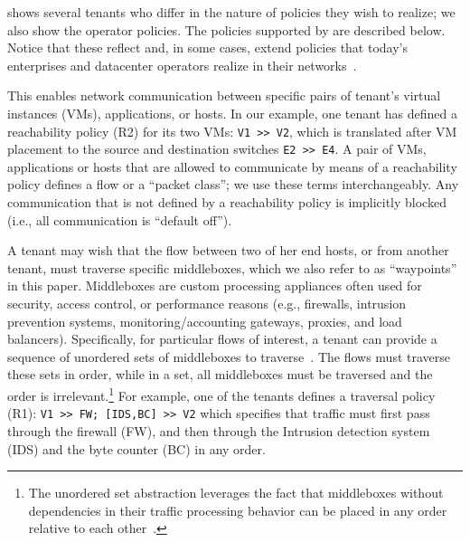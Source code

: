  
  shows several tenants who
 differ in the nature of policies they wish to realize; we also show
 the operator policies. The policies  supported by \Name are described
 below. Notice that these reflect and, in some cases, extend policies
 that today's enterprises and datacenter operators
 realize in their networks~\cite{mpa-imc15}.





 This enables network communication
  between specific pairs of tenant's virtual instances (VMs),
  applications, or hosts.  In our example, one tenant has defined a
  reachability policy (R2) for its two VMs: \texttt{V1 >> V2}, which
  is translated after VM placement  
  to the source and destination switches
   \texttt{E2 >> E4}. A pair of VMs, applications or hosts
  that are allowed to communicate by means of a reachability policy
  defines a flow or a ``packet class''; we use these terms
  interchangeably. Any communication that is not defined by a
  reachability policy is implicitly blocked (i.e., all communication
  is ``default off'').
  
 A tenant may wish that the flow
  between two of her end hosts, or from another tenant, must traverse
  specific middleboxes, which we also refer to as ``waypoints'' in
  this paper. Middleboxes are custom processing appliances often used
  for security, access control, or performance reasons (e.g.,
  firewalls, intrusion prevention systems, monitoring/accounting
  gateways, proxies, and load balancers). Specifically, for particular
  flows of interest, a tenant can provide a sequence of unordered sets
  of middleboxes
  to traverse~\cite{pga}. The flows must traverse these sets in order,
  while in a set, all middleboxes must be traversed and the order is
  irrelevant.\footnote{The unordered set abstraction leverages the
    fact that middleboxes without dependencies in their traffic
    processing behavior can be placed in any order relative to each
    other~\cite{pga}.} For example, one of the tenants defines a
  traversal policy (R1): \texttt{V1 >> FW; [IDS,BC] >> V2} which specifies
  that traffic must first pass through the firewall (FW), and then
  through the Intrusion detection system (IDS) and the byte counter
  (BC) in any order.

